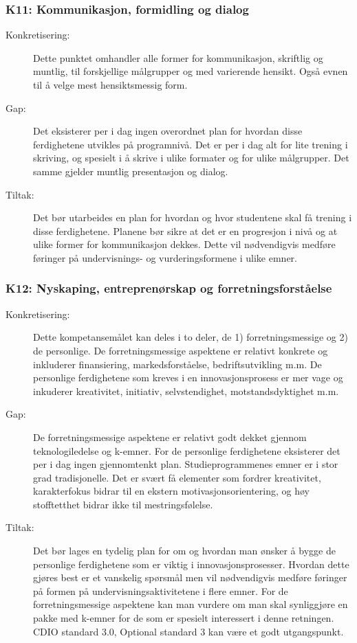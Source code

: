 \subsubsection{K11: Kommunikasjon, formidling og dialog}
\begin{description}
\item[Konkretisering:] Dette punktet omhandler alle former for kommunikasjon, skriftlig og muntlig, til forskjellige målgrupper og med varierende hensikt. Også evnen til å velge mest hensiktsmessig form.
\item[Gap:] Det eksisterer per i dag ingen overordnet plan for hvordan disse ferdighetene utvikles på programnivå. Det er per i dag alt for lite trening i skriving, og spesielt i å skrive i ulike formater og for ulike målgrupper. Det samme gjelder muntlig presentasjon og dialog.
\item[Tiltak:] Det bør utarbeides en plan for hvordan og hvor studentene skal få trening i disse ferdighetene. Planene bør sikre at det er en progresjon i nivå og at ulike former for kommunikasjon dekkes. Dette vil nødvendigvis medføre føringer på undervisnings- og vurderingsformene i ulike emner.
\end{description}

\subsubsection{K12: Nyskaping, entreprenørskap og forretningsforståelse}
\begin{description}
\item[Konkretisering:] Dette kompetansemålet kan deles i to deler, de 1) forretningsmessige og 2) de personlige. De forretningsmessige aspektene er relativt konkrete og inkluderer finansiering, markedsforståelse, bedriftsutvikling m.m. De personlige ferdighetene som kreves i en innovasjonsprosess er mer vage og inkuderer kreativitet, initiativ, selvstendighet, motstandsdyktighet m.m.
\item[Gap:] De forretningsmessige aspektene er relativt godt dekket gjennom teknologiledelse og k-emner. For de personlige ferdighetene eksisterer det per i dag ingen gjennomtenkt plan. Studieprogrammenes emner er i stor grad tradisjonelle. Det er svært få elementer som fordrer kreativitet, karakterfokus bidrar til en ekstern motivasjonsorientering, og høy stofftetthet bidrar ikke til mestringsfølelse. 
\item[Tiltak:] Det bør lages en tydelig plan for om og hvordan man ønsker å bygge de personlige ferdighetene som er viktig i innovasjonsprosesser. Hvordan dette gjøres best er et vanskelig spørsmål men vil nødvendigvis medføre føringer på formen på undervisningsaktivitetene i flere emner. For de forretningsmessige aspektene kan man vurdere om man skal synliggjøre en pakke med k-emner for de som er spesielt interessert i denne retningen. CDIO standard 3.0, Optional standard 3 kan være et godt utgangspunkt.
\end{description}
